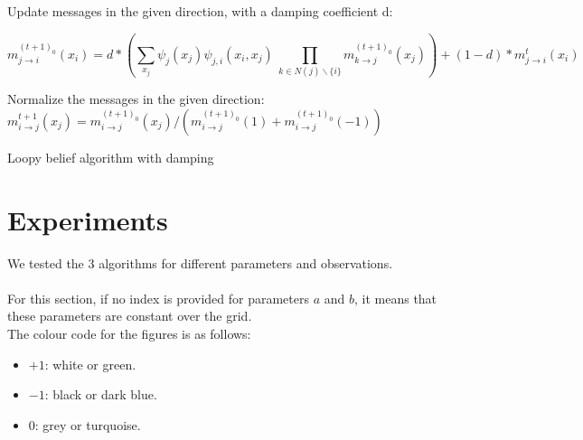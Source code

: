 \documentclass[a4paper]{article}
\begin{document}
    
    
    
    
        \begin{algorithm}[h]
         {
            
                {
                Update messages in the given direction, with a damping coefficient d:
                }
                
                {
                \begin{equation}
                 m_{j \rightarrow i}^{(t+1)_0} (x_i) = d * (\sum\limits_{x_j} \psi_j(x_j)\psi_{j,i}(x_i,x_j)  \   \prod\limits_{k \in N(j)\backslash \{i\} } m_{k \rightarrow j}^{(t+1)_0} (x_j) ) + (1-d)*m_{j \rightarrow i}^{t} (x_i)
                 \end{equation}
                
                }
                
                {
                Normalize the messages in the given direction:
                $m_{i \rightarrow j}^{t+1} (x_j) = m_{i \rightarrow j}^{(t+1)_0} (x_j) /( m_{i \rightarrow j}^{(t+1)_0} (1) + m_{i \rightarrow j}^{(t+1)_0} (-1))$
                }
                
            
        }

        \caption{Loopy belief algorithm with damping}
    	\label{algo:loopybelief}
    \end{algorithm}

 
    
\section{Experiments}
    We tested the 3 algorithms for different parameters and observations. 
    \paragraph{}
    For this section, if no index is provided for parameters $a$ and $b$, it means that these parameters are constant over the grid.
    \\
    The colour code for the figures is as follows: 
    \begin{itemize}
        \item $+1$: white or green.
        \item $-1$: black or dark blue.
        \item $0$: grey or turquoise.
    \end{itemize}
    
\end{document}
